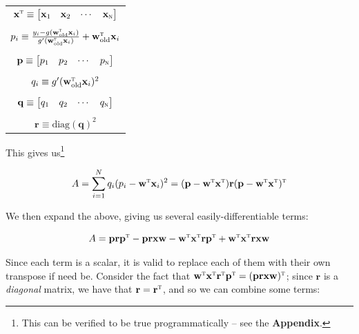 \documentclass[a4paper,10pt,english]{article}
\begin{document}
\begin{multicols*}{2}
\begin{table}[H]
\center
\begin{tabular}{c}
$\mathbf{x}^\textsc{t} \equiv \begin{bmatrix} \mathbf{x}_1 & \mathbf{x}_2 & \cdots & \mathbf{x}_\textsc{n} \end{bmatrix}$ \\ \\
$p_i \equiv \frac{y_i - g(\mathbf{w}_\text{old}^\textsc{t} \mathbf{x}_i)}{g^\prime(\mathbf{w}_\text{old}^\textsc{t} \mathbf{x}_i)} + \mathbf{w}_\text{old}^\textsc{t} \mathbf{x}_i$ \\ \\
$\mathbf{p} \equiv \begin{bmatrix} p_1 & p_2 & \cdots & p_\textsc{n} \end{bmatrix}$ \\ \\
$q_i \equiv g^\prime(\mathbf{w}_\text{old}^\textsc{t} \mathbf{x}_i)^2$ \\ \\
$\mathbf{q} \equiv \begin{bmatrix} q_1 & q_2 & \cdots & q_\textsc{n} \end{bmatrix}$ \\ \\
$\mathbf{r} \equiv \text{diag}(\mathbf{q})^2$
\end{tabular}
\end{table}

This gives us\footnote{This can be verified to be true programmatically – see the \textbf{Appendix}.}

\begin{equation}
\label{eq_1}
A = \sum_{i=1}^{N} q_i ( p_i - \mathbf{w}^\textsc{t} \mathbf{x}_i )^2 = (\mathbf{p} - \mathbf{w}^\textsc{t} \mathbf{x}^\textsc{t}) \mathbf{r} (\mathbf{p} - \mathbf{w}^\textsc{t} \mathbf{x}^\textsc{t})^\textsc{t}
\end{equation}

We then expand the above, giving us several easily-differentiable terms:

\begin{equation*}
A = \mathbf{p} \mathbf{r} \mathbf{p}^\textsc{t} - \mathbf{p} \mathbf{r} \mathbf{x} \mathbf{w} - \mathbf{w}^\textsc{t} \mathbf{x}^\textsc{t} \mathbf{r} \mathbf{p}^\textsc{t} + \mathbf{w}^\textsc{t} \mathbf{x}^\textsc{t} \mathbf{r} \mathbf{x} \mathbf{w}
\end{equation*}

Since each term is a scalar, it is valid to replace each of them with their own transpose if need be. Consider the fact that $\mathbf{w}^\textsc{t} \mathbf{x}^\textsc{t} \mathbf{r}^\textsc{t} \mathbf{p}^\textsc{t} = (\mathbf{p} \mathbf{r} \mathbf{x} \mathbf{w})^\textsc{t}$; since $\mathbf{r}$ is a \textit{diagonal} matrix, we have that $\mathbf{r} = \mathbf{r}^\textsc{t}$, and so we can combine some terms:


\end{multicols*}
\end{document}
